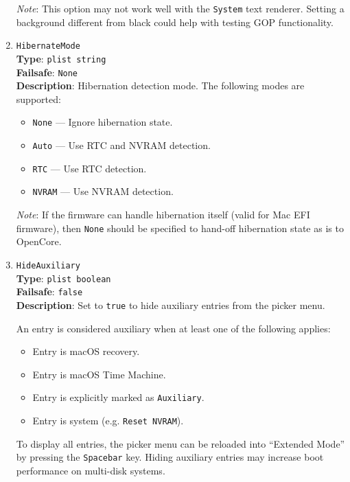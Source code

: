 \documentclass[]{article}
\providecommand{\tightlist}{%
  \setlength{\itemsep}{0pt}\setlength{\parskip}{0pt}}
\begin{document}
\begin{enumerate}
  \emph{Note}: This option may not work well with the \texttt{System} text renderer.
  Setting a background different from black could help with testing GOP functionality.

\item
  \texttt{HibernateMode}\\
  \textbf{Type}: \texttt{plist\ string}\\
  \textbf{Failsafe}: \texttt{None}\\
  \textbf{Description}: Hibernation detection mode. The following modes are supported:

  \begin{itemize}
  \tightlist
    \item \texttt{None} --- Ignore hibernation state.
    \item \texttt{Auto} --- Use RTC and NVRAM detection.
    \item \texttt{RTC} --- Use RTC detection.
    \item \texttt{NVRAM} --- Use NVRAM detection.
  \end{itemize}

  \emph{Note}: If the firmware can handle hibernation itself (valid for Mac EFI firmware),
  then \texttt{None} should be specified to hand-off hibernation state as is to OpenCore.

\item
  \texttt{HideAuxiliary}\\
  \textbf{Type}: \texttt{plist\ boolean}\\
  \textbf{Failsafe}: \texttt{false}\\
  \textbf{Description}: Set to \texttt{true} to hide auxiliary entries from the picker menu.

  An entry is considered auxiliary when at least one of the following applies:

  \begin{itemize}
  \tightlist
    \item Entry is macOS recovery.
    \item Entry is macOS Time Machine.
    \item Entry is explicitly marked as \texttt{Auxiliary}.
    \item Entry is system (e.g. \texttt{Reset NVRAM}).
  \end{itemize}

  To display all entries, the picker menu can be reloaded into ``Extended Mode'' by pressing the
  \texttt{Spacebar} key. Hiding auxiliary entries may increase boot performance on multi-disk systems.


\end{enumerate}
\end{document}
